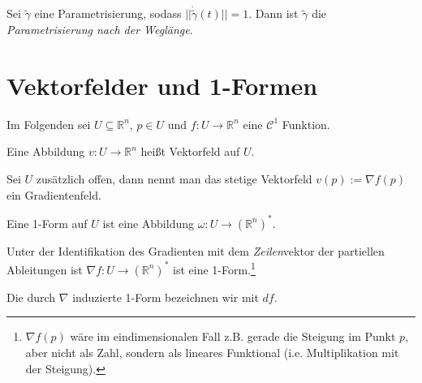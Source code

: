 \begin{definition}
	Sei $\tilde\gamma$ eine Parametrisierung, sodass $||\dot{\tilde\gamma}(t)|| = 1$. Dann ist $\tilde\gamma$ die \textit{Parametrisierung nach der Wegl\"ange}.
\end{definition}






\section{Vektorfelder und 1-Formen}
Im Folgenden sei $U \subseteq \mathbb R^n$, $p \in U$ und $f: U\rightarrow \mathbb R^n$ eine $\mathcal C^1$ Funktion.
\begin{definition}[Vektorfeld]
	Eine Abbildung $v: U \rightarrow \mathbb R^n$ hei\ss t Vektorfeld auf $U$.
\end{definition}

\begin{definition}[Gradientenfeld]
	Sei $U$ zus\"atzlich offen, dann nennt man das stetige Vektorfeld $v(p) := \nabla f(p)$ ein Gradientenfeld.
\end{definition}

\begin{definition}[1-Form]
	Eine 1-Form auf $U$ ist eine Abbildung $\omega: U\rightarrow (\mathbb R^n)^*$.
\end{definition}

\begin{remark}
	Unter der Identifikation des Gradienten mit dem \textit{Zeilen}vektor der partiellen Ableitungen ist $\nabla f: U\rightarrow (\mathbb R^n)^*$ ist eine 1-Form.\footnote{$\nabla f(p)$ w\"are im eindimensionalen Fall z.B. gerade die Steigung im Punkt $p$, aber nicht als Zahl, sondern als lineares Funktional (i.e. Multiplikation mit der Steigung).}
\end{remark}

\begin{definition}
	Die durch $\nabla$ induzierte 1-Form bezeichnen wir mit $df$.
\end{definition}


